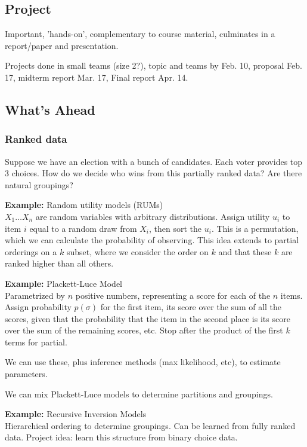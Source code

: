 \documentclass[twoside]{article}
\begin{document}
\subsection*{Project}
Important, 'hands-on', complementary to course material, culminates in a report/paper and presentation.

Projects done in small teams (size 2?), topic and teams by Feb. 10, proposal Feb. 17, midterm report Mar. 17, Final report Apr. 14.

\subsection*{What's Ahead}

\subsubsection*{Ranked data}
Suppose we have an election with a bunch of candidates.  Each voter provides top 3 choices.  How do we decide who wins from this partially ranked data?  Are there natural groupings? 


\textbf{Example:} Random utility models (RUMs)\\
	$X_1\dots X_n$ are random variables with arbitrary distributions.  Assign utility $u_i$ to item $i$ equal to a random draw from $X_i$, then sort the $u_i$.  This is a permutation, which we can calculate the probability of observing.  This idea extends to partial orderings on a $k$ subset, where we consider the order on $k$ and that these $k$ are ranked higher than all others.

\textbf{Example:} Plackett-Luce Model\\
	Parametrized by $n$ positive numbers, representing a score for each of the $n$ items.  Assign probability $p(\sigma)$ for the first item, its score over the sum of all the scores, given that the probability that the item in the second place is its score over the sum of the remaining scores, etc.  Stop after the product of the first $k$ terms for partial.
	
We can use these, plus inference methods (max likelihood, etc), to estimate parameters.

We can mix Plackett-Luce models to determine partitions and groupings.

\textbf{Example:} Recursive Inversion Models\\
	Hierarchical ordering to determine groupings.  Can be learned from fully ranked data.  Project idea: learn this structure from binary choice data.
	
\end{document}

